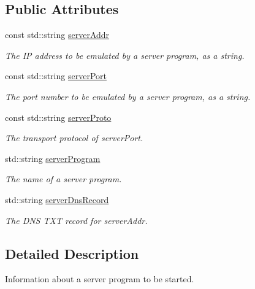 \subsection*{\-Public \-Attributes}
\begin{DoxyCompactItemize}
\item 
const std\-::string \hyperlink{structNERD_1_1ConnectionServer_1_1ServerRecord_a741796c62f55fc2d3b7ac5807d4bfdf8}{server\-Addr}
\begin{DoxyCompactList}\small\item\em \-The \-I\-P address to be emulated by a server program, as a string. \end{DoxyCompactList}\item 
const std\-::string \hyperlink{structNERD_1_1ConnectionServer_1_1ServerRecord_a8eeda51ef462eeabb3d66b130fe70e56}{server\-Port}
\begin{DoxyCompactList}\small\item\em \-The port number to be emulated by a server program, as a string. \end{DoxyCompactList}\item 
const std\-::string \hyperlink{structNERD_1_1ConnectionServer_1_1ServerRecord_a8e253a76e9dbd9eaf239f09ff9d1e69f}{server\-Proto}
\begin{DoxyCompactList}\small\item\em \-The transport protocol of {\ttfamily server\-Port}. \end{DoxyCompactList}\item 
std\-::string \hyperlink{structNERD_1_1ConnectionServer_1_1ServerRecord_a9bacaaa47cedda53feb069fbc1be8b8c}{server\-Program}
\begin{DoxyCompactList}\small\item\em \-The name of a server program. \end{DoxyCompactList}\item 
std\-::string \hyperlink{structNERD_1_1ConnectionServer_1_1ServerRecord_a1272b0f4ca611ecc8c2b2b76c75c5f91}{server\-Dns\-Record}
\begin{DoxyCompactList}\small\item\em \-The \-D\-N\-S \-T\-X\-T record for {\ttfamily server\-Addr}. \end{DoxyCompactList}\end{DoxyCompactItemize}


\subsection{\-Detailed \-Description}
\-Information about a server program to be started. 

